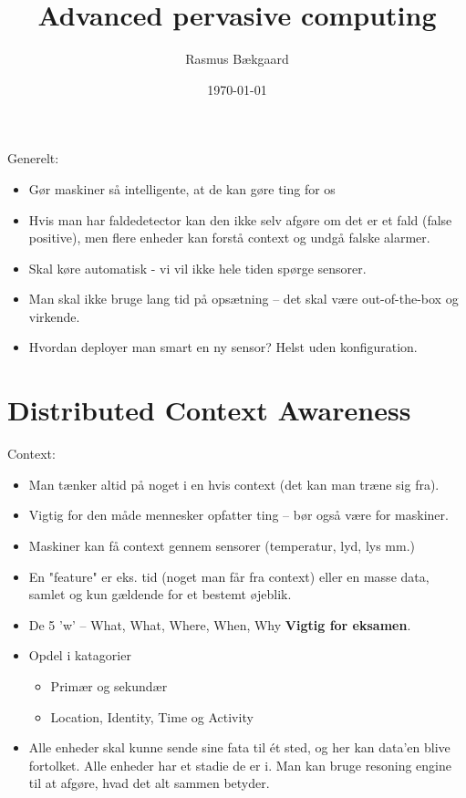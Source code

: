 \documentclass[oneside, 10pt]{article}
\title{Advanced pervasive computing}
\author{Rasmus Bækgaard}
\date{\today}
\begin{document}
\maketitle

Generelt:
\begin{itemize}
	\item Gør maskiner så intelligente, at de kan gøre ting for os
	\item Hvis man har faldedetector kan den ikke selv afgøre om det er et fald (false positive), men flere enheder kan forstå context og undgå falske alarmer.
	\item Skal køre automatisk - vi vil ikke hele tiden spørge sensorer.
	\item Man skal ikke bruge lang tid på opsætning -- det skal være out-of-the-box og virkende.
	\item Hvordan deployer man smart en ny sensor? Helst uden konfiguration.
\end{itemize}

\section{Distributed Context Awareness}

Context:
\begin{itemize}
	\item Man tænker altid på noget i en hvis context (det kan man træne sig fra).
	\item Vigtig for den måde mennesker opfatter ting -- bør også være for maskiner.
	\item Maskiner kan få context gennem sensorer (temperatur, lyd, lys mm.)
	\item En "feature" er eks. tid (noget man får fra context) eller en masse data, samlet og kun gældende for et bestemt øjeblik.
	\item De 5 'w' -- What, What, Where, When, Why \textbf{Vigtig for eksamen}.
	\item Opdel i katagorier
	\begin{itemize}
		\item Primær og sekundær
		\item Location, Identity, Time og Activity
	\end{itemize}
	\item Alle enheder skal kunne sende sine fata til ét sted, og her kan data'en blive fortolket. Alle enheder har et stadie de er i. Man kan bruge resoning engine til at afgøre, hvad det alt sammen betyder.
\end{itemize}
\end{document}
